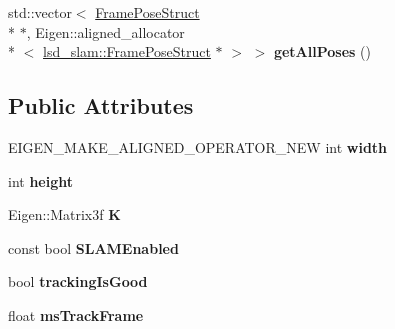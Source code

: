\begin{DoxyCompactItemize}
\item 
\hypertarget{classlsd__slam_1_1_slam_system_addea24a2ab2476d64f2a53df0edf8ccc}{std\-::vector$<$ \hyperlink{classlsd__slam_1_1_frame_pose_struct}{Frame\-Pose\-Struct} \\*
$\ast$, Eigen\-::aligned\-\_\-allocator\\*
$<$ \hyperlink{classlsd__slam_1_1_frame_pose_struct}{lsd\-\_\-slam\-::\-Frame\-Pose\-Struct} $\ast$ $>$ $>$ {\bfseries get\-All\-Poses} ()}\label{classlsd__slam_1_1_slam_system_addea24a2ab2476d64f2a53df0edf8ccc}

\end{DoxyCompactItemize}
\subsection*{Public Attributes}
\begin{DoxyCompactItemize}
\item 
\hypertarget{classlsd__slam_1_1_slam_system_abf37dab386985c2b8f4be082054aaca9}{E\-I\-G\-E\-N\-\_\-\-M\-A\-K\-E\-\_\-\-A\-L\-I\-G\-N\-E\-D\-\_\-\-O\-P\-E\-R\-A\-T\-O\-R\-\_\-\-N\-E\-W int {\bfseries width}}\label{classlsd__slam_1_1_slam_system_abf37dab386985c2b8f4be082054aaca9}

\item 
\hypertarget{classlsd__slam_1_1_slam_system_a46b251157291420a574325bb0afd111d}{int {\bfseries height}}\label{classlsd__slam_1_1_slam_system_a46b251157291420a574325bb0afd111d}

\item 
\hypertarget{classlsd__slam_1_1_slam_system_aa6da73a383a85f86d5627557bacb9030}{Eigen\-::\-Matrix3f {\bfseries K}}\label{classlsd__slam_1_1_slam_system_aa6da73a383a85f86d5627557bacb9030}

\item 
\hypertarget{classlsd__slam_1_1_slam_system_a46273479640afc3fe654df6134f1b46b}{const bool {\bfseries S\-L\-A\-M\-Enabled}}\label{classlsd__slam_1_1_slam_system_a46273479640afc3fe654df6134f1b46b}

\item 
\hypertarget{classlsd__slam_1_1_slam_system_ac1d4bb2fde9636ff0fdd77f26aec1adf}{bool {\bfseries tracking\-Is\-Good}}\label{classlsd__slam_1_1_slam_system_ac1d4bb2fde9636ff0fdd77f26aec1adf}

\item 
\hypertarget{classlsd__slam_1_1_slam_system_ad9c806b5759673d349285a1932371468}{float {\bfseries ms\-Track\-Frame}}\label{classlsd__slam_1_1_slam_system_ad9c806b5759673d349285a1932371468}


\end{DoxyCompactItemize}
